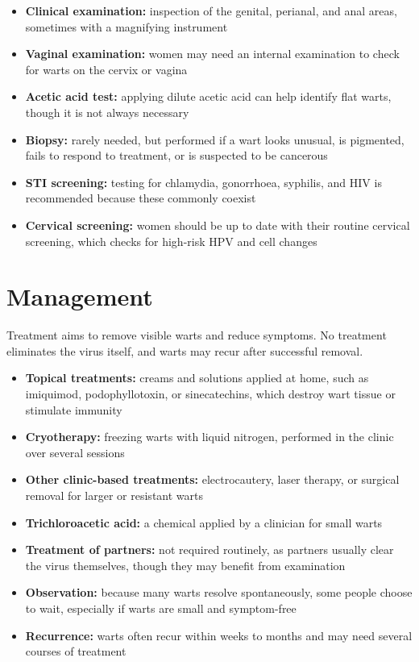 \begin{itemize}
    \item \textbf{Clinical examination:} inspection of the genital, perianal, and anal areas, sometimes with a magnifying instrument
    \item \textbf{Vaginal examination:} women may need an internal examination to check for warts on the cervix or vagina
    \item \textbf{Acetic acid test:} applying dilute acetic acid can help identify flat warts, though it is not always necessary
    \item \textbf{Biopsy:} rarely needed, but performed if a wart looks unusual, is pigmented, fails to respond to treatment, or is suspected to be cancerous
    \item \textbf{STI screening:} testing for chlamydia, gonorrhoea, syphilis, and HIV is recommended because these commonly coexist
    \item \textbf{Cervical screening:} women should be up to date with their routine cervical screening, which checks for high-risk HPV and cell changes
\end{itemize}

\section*{Management}
Treatment aims to remove visible warts and reduce symptoms. No treatment eliminates the virus itself, and warts may recur after successful removal.

\begin{itemize}
    \item \textbf{Topical treatments:} creams and solutions applied at home, such as imiquimod, podophyllotoxin, or sinecatechins, which destroy wart tissue or stimulate immunity
    \item \textbf{Cryotherapy:} freezing warts with liquid nitrogen, performed in the clinic over several sessions
    \item \textbf{Other clinic-based treatments:} electrocautery, laser therapy, or surgical removal for larger or resistant warts
    \item \textbf{Trichloroacetic acid:} a chemical applied by a clinician for small warts
    \item \textbf{Treatment of partners:} not required routinely, as partners usually clear the virus themselves, though they may benefit from examination
    \item \textbf{Observation:} because many warts resolve spontaneously, some people choose to wait, especially if warts are small and symptom-free
    \item \textbf{Recurrence:} warts often recur within weeks to months and may need several courses of treatment
\end{itemize}

